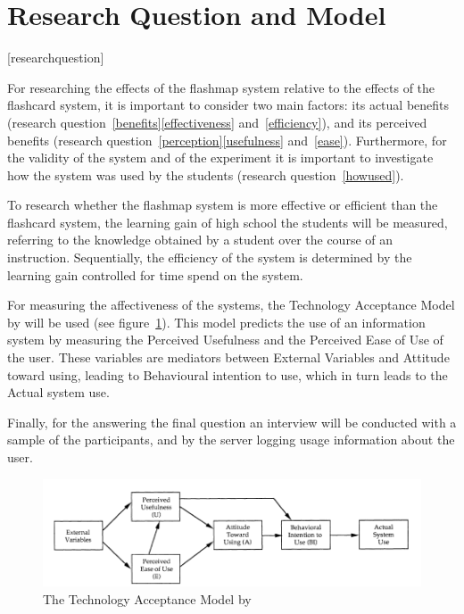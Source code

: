 \documentclass[11pt,twoside]{report} %
\begin{document}
\section{Research Question and Model}
\renewcommand{\theresearchquestion}{\Roman{researchquestion}}
[researchquestion]
\renewcommand{\thesubquestion}{\alph{subquestion}}



For researching the effects of the flashmap system relative to the effects of the flashcard system, it is important to consider two main factors: its actual benefits (research question~\ref{benefits}\ref{effectiveness} and~\ref{efficiency}), and its perceived benefits (research question~\ref{perception}\ref{usefulness} and~\ref{ease}). Furthermore, for the validity of the system and of the experiment it is important to investigate how the system was used by the students (research question~\ref{howused}).

To research whether the flashmap system is more effective or efficient than the flashcard system, the learning gain of high school the students will be measured, referring to the knowledge obtained by a student over the course of an instruction. Sequentially, the efficiency of the system is determined by the learning gain controlled for time spend on the system.

For measuring the affectiveness of the systems, the Technology Acceptance Model by  will be used (see figure~\ref{fig:tam}). This model predicts the use of an information system by measuring the Perceived Usefulness and the Perceived Ease of Use of the user. These variables are mediators between External Variables and Attitude toward using, leading to Behavioural intention to use, which in turn leads to the Actual system use.

Finally, for the answering the final question an interview will be conducted with a sample of the participants, and by the server logging usage information about the user.

\begin{figure}
    \centering
    \includegraphics[width=\textwidth]{img/tam}
    \caption{The Technology Acceptance Model by \protect{}}
    \label{fig:tam}
\end{figure}
\end{document}
